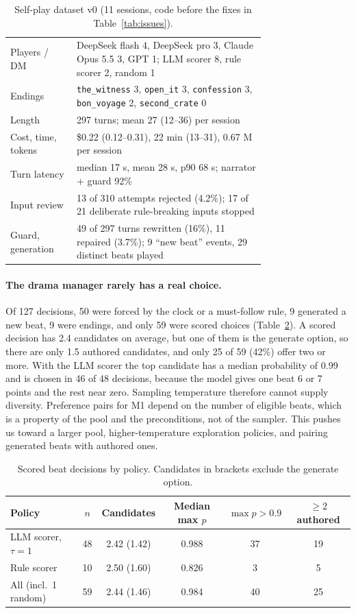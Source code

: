 \documentclass{article}
\begin{document}
\begin{table}[t]
\centering\small
\caption{Self-play dataset v0 (11 sessions, code before the fixes in Table~\ref{tab:issues}).}
\label{tab:data}
\begin{tabular}{lp{0.74\linewidth}}
\toprule
Players / DM & DeepSeek flash 4, DeepSeek pro 3, Claude Opus 5.5 3, GPT 1; LLM scorer 8, rule scorer 2, random 1 \\
Endings & \texttt{the\_witness} 3, \texttt{open\_it} 3, \texttt{confession} 3, \texttt{bon\_voyage} 2, \texttt{second\_crate} 0 \\
Length & 297 turns; mean 27 (12--36) per session \\
Cost, time, tokens & \$0.22 (0.12--0.31), 22 min (13--31), 0.67 M per session \\
Turn latency & median 17 s, mean 28 s, p90 68 s; narrator + guard 92\% \\
Input review & 13 of 310 attempts rejected (4.2\%); 17 of 21 deliberate rule-breaking inputs stopped \\
Guard, generation & 49 of 297 turns rewritten (16\%), 11 repaired (3.7\%); 9 ``new beat'' events, 29 distinct beats played \\
\bottomrule
\end{tabular}
\end{table}

\paragraph{The drama manager rarely has a real choice.}
Of 127 decisions, 50 were forced by the clock or a must-follow rule, 9 generated a new beat, 9 were endings, and only 59 were scored choices (Table~\ref{tab:dm}). A scored decision has 2.4 candidates on average, but one of them is the generate option, so there are only 1.5 authored candidates, and only 25 of 59 (42\%) offer two or more. With the LLM scorer the top candidate has a median probability of 0.99 and is chosen in 46 of 48 decisions, because the model gives one beat 6 or 7 points and the rest near zero. Sampling temperature therefore cannot supply diversity. Preference pairs for M1 depend on the number of eligible beats, which is a property of the pool and the preconditions, not of the sampler. This pushes us toward a larger pool, higher-temperature exploration policies, and pairing generated beats with authored ones.

\begin{table}[t]
\centering\small
\caption{Scored beat decisions by policy. Candidates in brackets exclude the generate option.}
\label{tab:dm}
\begin{tabular}{lccccc}
\toprule
Policy & $n$ & Candidates & Median max $p$ & $\max p>0.9$ & $\ge 2$ authored \\
\midrule
LLM scorer, $\tau{=}1$ & 48 & 2.42 (1.42) & 0.988 & 37 & 19 \\
Rule scorer & 10 & 2.50 (1.60) & 0.826 & 3 & 5 \\
All (incl.\ 1 random) & 59 & 2.44 (1.46) & 0.984 & 40 & 25 \\
\bottomrule
\end{tabular}
\end{table}
\end{document}
